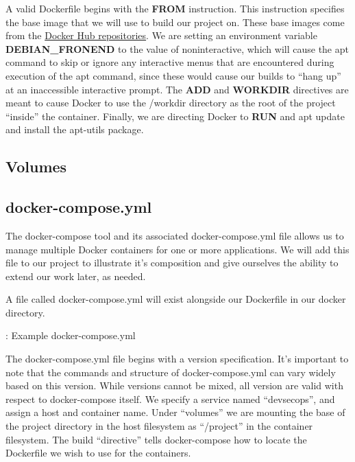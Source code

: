 \justify{}
A valid Dockerfile begins with the \textbf{FROM} instruction. This
instruction specifies the base image that we will use to build our
project on. These base images come from the
\href{https://docs.docker.com/docker-hub/repos/}{Docker Hub
  repositories}. We are setting an environment variable
\textbf{DEBIAN\_FRONEND} to the value of noninteractive, which will
cause the apt command to skip or ignore any interactive menus that are
encountered during execution of the apt command, since these would cause
our builds to ``hang up'' at an inaccessible interactive prompt. The
\textbf{ADD} and \textbf{WORKDIR} directives are meant to cause Docker
to use the /workdir directory as the root of the project ``inside'' the
container. Finally, we are directing Docker to \textbf{RUN} and apt
update and install the apt-utils package.

\subsection{Volumes}

\subsection{docker-compose.yml}
\justify{}
The docker-compose tool and its associated docker-compose.yml file
allows us to manage multiple Docker containers for one or more
applications. We will add this file to our project to illustrate it's
composition and give ourselves the ability to extend our work later, as
needed.

\justify{}
A file called docker-compose.yml will exist
alongside our Dockerfile in our docker directory.

\begin{mybox}{\thetcbcounter: Example docker-compose.yml}
  
\end{mybox}

\justify
The docker-compose.yml file begins with a version specification. It's
important to note that the commands and structure of docker-compose.yml
can vary widely based on this version. While versions cannot be mixed,
all version are valid with respect to docker-compose itself. We specify
a service named ``devsecops'', and assign a host and container name. Under
``volumes'' we are mounting the base of the project directory in the host
filesystem as ``/project'' in the container filesystem. The build
``directive'' tells docker-compose how to locate the Dockerfile we wish to
use for the containers.

